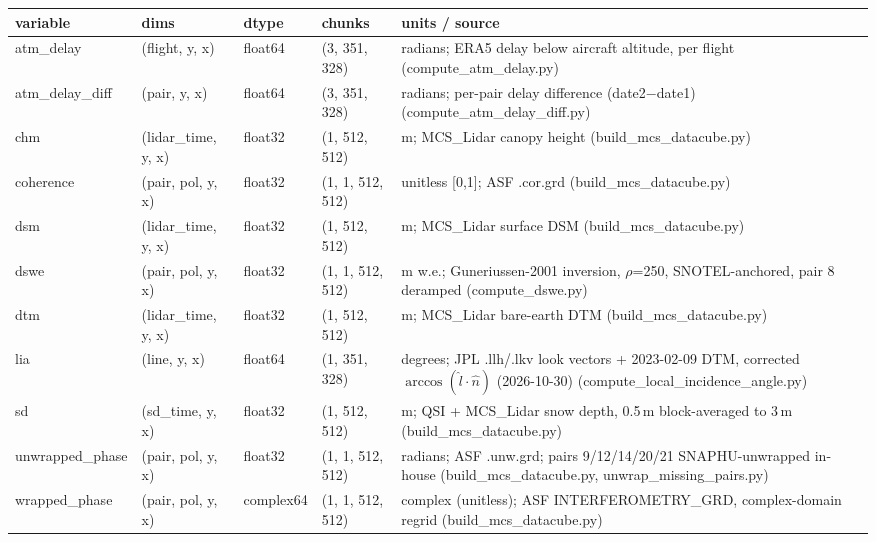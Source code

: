 \begin{tabular}{p{2.6cm}p{3.1cm}p{1.5cm}p{2.0cm}p{5.6cm}}
\hline
variable & dims & dtype & chunks & units / source \\
\hline
atm\_delay & (flight, y, x) & float64 & (3, 351, 328) & radians; ERA5 delay below aircraft altitude, per flight (compute\_atm\_delay.py) \\
atm\_delay\_diff & (pair, y, x) & float64 & (3, 351, 328) & radians; per-pair delay difference (date2$-$date1) (compute\_atm\_delay\_diff.py) \\
chm & (lidar\_time, y, x) & float32 & (1, 512, 512) & m; MCS\_Lidar canopy height (build\_mcs\_datacube.py) \\
coherence & (pair, pol, y, x) & float32 & (1, 1, 512, 512) & unitless [0,1]; ASF .cor.grd (build\_mcs\_datacube.py) \\
dsm & (lidar\_time, y, x) & float32 & (1, 512, 512) & m; MCS\_Lidar surface DSM (build\_mcs\_datacube.py) \\
dswe & (pair, pol, y, x) & float32 & (1, 1, 512, 512) & m w.e.; Guneriussen-2001 inversion, $\rho$=250, SNOTEL-anchored, pair 8 deramped (compute\_dswe.py) \\
dtm & (lidar\_time, y, x) & float32 & (1, 512, 512) & m; MCS\_Lidar bare-earth DTM (build\_mcs\_datacube.py) \\
lia & (line, y, x) & float64 & (1, 351, 328) & degrees; JPL .llh/.lkv look vectors + 2023-02-09 DTM, corrected $\arccos(\hat{l}\cdot\hat{n})$ (2026-10-30) (compute\_local\_incidence\_angle.py) \\
sd & (sd\_time, y, x) & float32 & (1, 512, 512) & m; QSI + MCS\_Lidar snow depth, 0.5\,m block-averaged to 3\,m (build\_mcs\_datacube.py) \\
unwrapped\_phase & (pair, pol, y, x) & float32 & (1, 1, 512, 512) & radians; ASF .unw.grd; pairs 9/12/14/20/21 SNAPHU-unwrapped in-house (build\_mcs\_datacube.py, unwrap\_missing\_pairs.py) \\
wrapped\_phase & (pair, pol, y, x) & complex64 & (1, 1, 512, 512) & complex (unitless); ASF INTERFEROMETRY\_GRD, complex-domain regrid (build\_mcs\_datacube.py) \\
\hline
\end{tabular}
